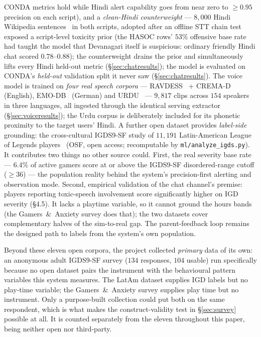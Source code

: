 \documentclass[11pt,a4paper]{article}
\begin{document}
CONDA metrics hold while Hindi alert capability goes from near zero to
$\geq$$0.95$ precision on each script), and a \emph{clean-Hindi counterweight}
--- $8{,}000$ Hindi Wikipedia sentences~\cite{wikihi} in both scripts, adopted
after an offline STT chain test exposed a script-level toxicity prior (the
HASOC rows' $53\%$ offensive base rate had taught the model that Devanagari
itself is suspicious: ordinary friendly Hindi chat scored $0.78$--$0.88$); the
counterweight drains the prior and simultaneously lifts every Hindi held-out
metric (\S\ref{sec:chatresults}); the model is evaluated on CONDA's \emph{held-out} validation split it
never saw (\S\ref{sec:chatresults}). The voice model is trained on \emph{four real
speech corpora} --- RAVDESS~\cite{ravdess2018} + CREMA-D~\cite{cremad2014} (English),
EMO-DB~\cite{emodb2005} (German) and URDU~\cite{urdu2018} ---
$9{,}817$ clips across $154$ speakers in three languages, all ingested through the
identical serving extractor (\S\ref{sec:voiceresults}); the Urdu corpus is
deliberately included for its phonetic proximity to the target users' Hindi.
A further open dataset provides \emph{label-side} grounding: the cross-cultural
IGDS9-SF study of $11{,}191$ Latin-American League of Legends players~\cite{igdslatam2024} (OSF,
open access; recomputable by \texttt{ml/analyze\_igds.py}). It contributes two things no other
source could. First, the real severity base rate --- $6.4\%$ of active gamers score
at or above the IGDS9-SF disordered-range cutoff ($\geq$36) --- the population
reality behind the system's precision-first alerting and observation mode. Second,
empirical validation of the chat channel's premise: players reporting toxic-speech
involvement score significantly higher on IGD severity (\S4.5). It lacks a playtime
variable, so it cannot ground the hours bands (the Gamers~\&~Anxiety survey does
that); the two datasets cover complementary halves of the sim-to-real gap. The
parent-feedback loop remains the designed path to labels from the system's own
population.

Beyond these eleven open corpora, the project collected \emph{primary} data of
its own: an anonymous adult IGDS9-SF survey ($134$ responses, $104$ usable) run
specifically because no open dataset pairs the instrument with the behavioural
pattern variables this system measures. The LatAm dataset supplies IGD labels
but no play-time variable; the Gamers~\&~Anxiety survey supplies play time but
no instrument. Only a purpose-built collection could put both on the same
respondent, which is what makes the construct-validity test in
\S\ref{sec:survey} possible at all. It is counted separately from the eleven
throughout this paper, being neither open nor third-party.
\end{document}
